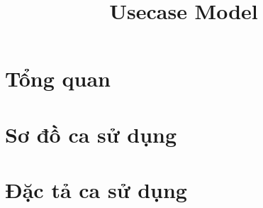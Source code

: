 \documentclass[12pt, a4paper]{article}
\title{Usecase Model}
\begin{document}
	
	
	\clearpage
	
	
	\clearpage
	
	\tableofcontents 
	\clearpage
	
	
	
	
	 
	
	
	
	\section{Tổng quan}
	
	\clearpage
	
	\section{Sơ đồ ca sử dụng}
	
	\clearpage
	
	\section{Đặc tả ca sử dụng}
	
	\clearpage
	
	\clearpage
	\glsaddall
	\printglossary[title={Giải thích thuật ngữ}]

	
\end{document}
